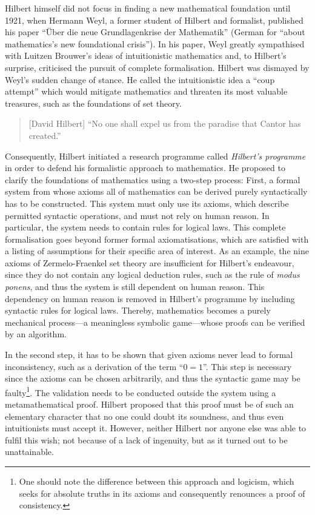 \documentclass{article}
\begin{document}
Hilbert himself did not focus in finding a new mathematical foundation until 1921, when Hermann Weyl, a former student of Hilbert and formalist, published his paper ``Über die neue Grundlagenkrise der Mathematik'' (German for ``about mathematics's new foundational crisis''). In his paper, Weyl greatly sympathised with Luitzen Brouwer's ideas of intuitionistic mathematics and, to Hilbert's surprise, criticised the pursuit of complete formalisation. Hilbert was dismayed by Weyl's sudden change of stance. He called the intuitionistic idea a ``coup attempt'' which would mitigate mathematics and threaten its most valuable treasures, such as the foundations of set theory.\cite{hilbert_coup}
\begin{quote}[David Hilbert]
``No one shall expel us from the paradise that Cantor has created.''\cite{hilbert_paradise}
\end{quote}
Consequently, Hilbert initiated a research programme called \textit{Hilbert's programme} in order to defend his formalistic approach to mathematics. He proposed to clarify the foundations of mathematics using a two-step process: First, a formal system from whose axioms all of mathematics can be derived purely syntactically has to be constructed. This system must only use its axioms, which describe permitted syntactic operations, and must not rely on human reason. 
In particular, the system needs to contain rules for logical laws. This complete formalisation goes beyond former formal axiomatisations, which are satisfied with a listing of assumptions for their specific area of interest. As an example, the nine axioms of Zermelo-Fraenkel set theory are insufficient for Hilbert's endeavour, since they do not contain any logical deduction rules, such as the rule of \textit{modus ponens}, and thus the system is still dependent on human reason. This dependency on human reason is removed in Hilbert's programme by including syntactic rules for logical laws. Thereby, mathematics becomes a purely mechanical process---a meaningless symbolic game---whose proofs can be verified by an algorithm.

In the second step, it has to be shown that given axioms never lead to formal inconsistency, such as a derivation of the term ``$0=1$''. This step is necessary since the axioms can be chosen arbitrarily, and thus the syntactic game may be faulty\footnote{One should note the difference between this approach and logicism, which seeks for absolute truths in its axioms and consequently renounces a proof of consistency.}. The validation needs to be conducted outside the system using a metamathematical proof. Hilbert proposed that this proof must be of such an elementary character that no one could doubt its soundness, and thus even intuitionists must accept it. However, neither Hilbert nor anyone else was able to fulfil this wish; not because of a lack of ingenuity, but as it turned out to be unattainable.
\end{document}
